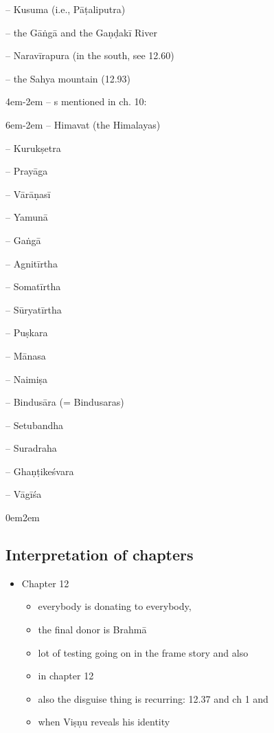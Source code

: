 \documentclass[11pt]{book}
\begin{document}
-- Kusuma (i.e., Pāṭaliputra)

-- the Gāṅgā and the Gaṇḍakī River

-- Naravīrapura (in the south, see 12.60)

-- the Sahya mountain (12.93)

\leftskip4em\parindent-2em
-- s mentioned in ch. 10:

\leftskip6em\parindent-2em
    -- Himavat (the Himalayas)
    
	-- Kurukṣetra
	
	-- Prayāga
	
	-- Vārāṇasī
 	
 	-- Yamunā
 	
 	-- Gaṅgā
 	
 	-- Agnitīrtha %
 	
 	-- Somatīrtha %
 	
 	-- Sūryatīrtha %
 	
 	-- Puṣkara %
 	
 	-- Mānasa %
    
    -- Naimiṣa %
    
    -- Bindusāra (= Bindusaras) %
    
    -- Setubandha %
    
    -- Suradraha %
    
    -- Ghaṇṭikeśvara
    
    -- Vāgīśa





\leftskip0em\parindent2em


\vfill
\pagebreak




\subsection{Interpretation of chapters}

\begin{itemize}

\item
  Chapter 12

  \begin{itemize}
  
  \item
    everybody is donating to everybody,
  \item
    the final donor is Brahmā
  \item
    lot of testing going on in the frame story and also
  \item
    in chapter 12
  \item
    also the disguise thing is recurring: 12.37 and ch 1 and
  \item
    when Viṣṇu reveals his identity
  \end{itemize}
\end{itemize}
\end{document}
